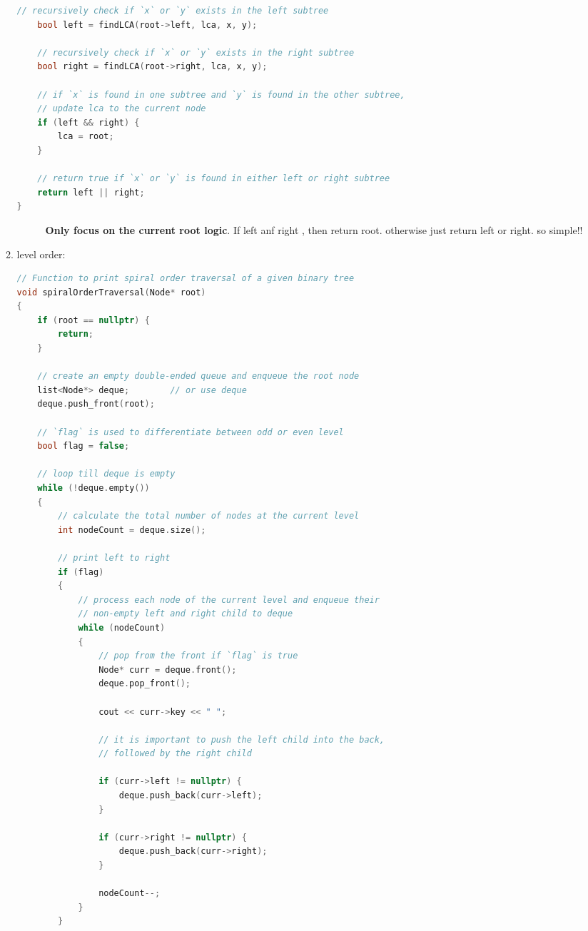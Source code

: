 \documentclass[a4paper,11pt,twoside]{book}
\begin{document}
\begin{itemize}
\begin{enumerate}
\begin{lstlisting}[frame=single, language=c++]
	// recursively check if `x` or `y` exists in the left subtree
	bool left = findLCA(root->left, lca, x, y);
	
	// recursively check if `x` or `y` exists in the right subtree
	bool right = findLCA(root->right, lca, x, y);
	
	// if `x` is found in one subtree and `y` is found in the other subtree,
	// update lca to the current node
	if (left && right) {
		lca = root;
	}
	
	// return true if `x` or `y` is found in either left or right subtree
	return left || right;
}
\end{lstlisting}
\begin{description}
	\item[] \textbf{Only focus on the current root logic}. If left anf right , then return root. otherwise just return left or right.  so simple!!
\end{description}


\item level order:
\begin{lstlisting}[frame=single, language=c++]
// Function to print spiral order traversal of a given binary tree
void spiralOrderTraversal(Node* root)
{
	if (root == nullptr) {
		return;
	}
	
	// create an empty double-ended queue and enqueue the root node
	list<Node*> deque;        // or use deque
	deque.push_front(root);
	
	// `flag` is used to differentiate between odd or even level
	bool flag = false;
	
	// loop till deque is empty
	while (!deque.empty())
	{
		// calculate the total number of nodes at the current level
		int nodeCount = deque.size();
		
		// print left to right
		if (flag)
		{
			// process each node of the current level and enqueue their
			// non-empty left and right child to deque
			while (nodeCount)
			{
				// pop from the front if `flag` is true
				Node* curr = deque.front();
				deque.pop_front();
				
				cout << curr->key << " ";
				
				// it is important to push the left child into the back,
				// followed by the right child
				
				if (curr->left != nullptr) {
					deque.push_back(curr->left);
				}
				
				if (curr->right != nullptr) {
					deque.push_back(curr->right);
				}
				
				nodeCount--;
			}
		}
		

\end{lstlisting}
\end{enumerate}
\end{itemize}
\end{document}

